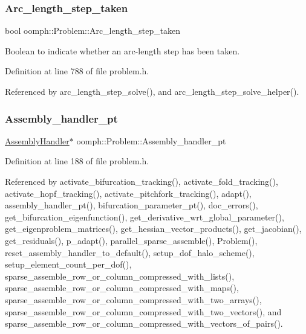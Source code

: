 \subsubsection{\texorpdfstring{Arc\+\_\+length\+\_\+step\+\_\+taken}{Arc\_length\_step\_taken}}
{\footnotesize\ttfamily bool oomph\+::\+Problem\+::\+Arc\+\_\+length\+\_\+step\+\_\+taken\hspace{0.3cm}{\ttfamily [protected]}}



Boolean to indicate whether an arc-\/length step has been taken. 



Definition at line 788 of file problem.\+h.



Referenced by arc\+\_\+length\+\_\+step\+\_\+solve(), and arc\+\_\+length\+\_\+step\+\_\+solve\+\_\+helper().

\mbox{\label{classoomph_1_1Problem_aefc325e2e116c389a24c9871e41bdb55}} 
\subsubsection{\texorpdfstring{Assembly\+\_\+handler\+\_\+pt}{Assembly\_handler\_pt}}
{\footnotesize\ttfamily \hyperlink{classoomph_1_1AssemblyHandler}{Assembly\+Handler}$\ast$ oomph\+::\+Problem\+::\+Assembly\+\_\+handler\+\_\+pt\hspace{0.3cm}{\ttfamily [private]}}



Definition at line 188 of file problem.\+h.



Referenced by activate\+\_\+bifurcation\+\_\+tracking(), activate\+\_\+fold\+\_\+tracking(), activate\+\_\+hopf\+\_\+tracking(), activate\+\_\+pitchfork\+\_\+tracking(), adapt(), assembly\+\_\+handler\+\_\+pt(), bifurcation\+\_\+parameter\+\_\+pt(), doc\+\_\+errors(), get\+\_\+bifurcation\+\_\+eigenfunction(), get\+\_\+derivative\+\_\+wrt\+\_\+global\+\_\+parameter(), get\+\_\+eigenproblem\+\_\+matrices(), get\+\_\+hessian\+\_\+vector\+\_\+products(), get\+\_\+jacobian(), get\+\_\+residuals(), p\+\_\+adapt(), parallel\+\_\+sparse\+\_\+assemble(), Problem(), reset\+\_\+assembly\+\_\+handler\+\_\+to\+\_\+default(), setup\+\_\+dof\+\_\+halo\+\_\+scheme(), setup\+\_\+element\+\_\+count\+\_\+per\+\_\+dof(), sparse\+\_\+assemble\+\_\+row\+\_\+or\+\_\+column\+\_\+compressed\+\_\+with\+\_\+lists(), sparse\+\_\+assemble\+\_\+row\+\_\+or\+\_\+column\+\_\+compressed\+\_\+with\+\_\+maps(), sparse\+\_\+assemble\+\_\+row\+\_\+or\+\_\+column\+\_\+compressed\+\_\+with\+\_\+two\+\_\+arrays(), sparse\+\_\+assemble\+\_\+row\+\_\+or\+\_\+column\+\_\+compressed\+\_\+with\+\_\+two\+\_\+vectors(), and sparse\+\_\+assemble\+\_\+row\+\_\+or\+\_\+column\+\_\+compressed\+\_\+with\+\_\+vectors\+\_\+of\+\_\+pairs().

